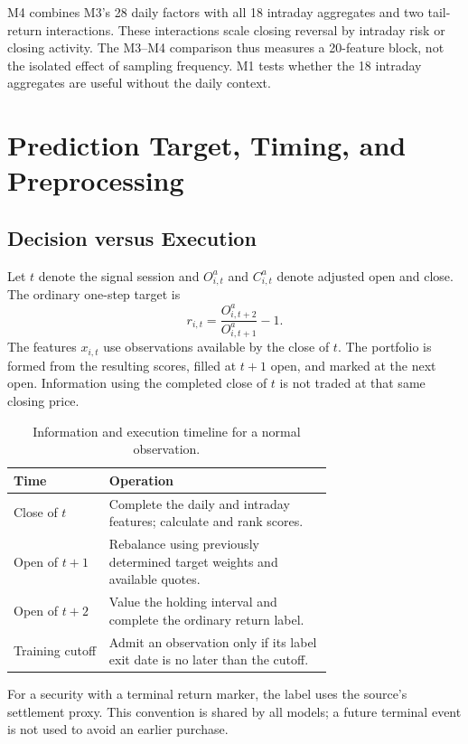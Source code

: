 \documentclass[11pt,a4paper]{article}
\begin{document}
M4 combines M3's 28 daily factors with all 18 intraday aggregates and two
tail-return interactions. These interactions scale closing reversal by
intraday risk or closing activity. The M3--M4 comparison thus measures a
20-feature block, not the isolated effect of sampling frequency. M1 tests
whether the 18 intraday aggregates are useful without the daily context.

\section{Prediction Target, Timing, and Preprocessing}
\label{sec:labels}
\subsection{Decision versus Execution}
Let $t$ denote the signal session and $O^{a}_{i,t}$ and $C^{a}_{i,t}$ denote
adjusted open and close. The ordinary one-step target is
\begin{equation}
r_{i,t}=\frac{O^{a}_{i,t+2}}{O^{a}_{i,t+1}}-1.
\label{eq:label}
\end{equation}
The features $x_{i,t}$ use observations available by the close of $t$. The
portfolio is formed from the resulting scores, filled at $t+1$ open, and marked
at the next open. Information using the completed close of $t$ is not traded
at that same closing price.

\begin{table}[htbp]\centering\small
\caption{Information and execution timeline for a normal observation.}
\label{tab:timeline}
\begin{tabular}{lp{0.70\linewidth}}\toprule
Time & Operation\\\midrule
Close of $t$ & Complete the daily and intraday features; calculate and rank scores.\\
Open of $t+1$ & Rebalance using previously determined target weights and available quotes.\\
Open of $t+2$ & Value the holding interval and complete the ordinary return label.\\
Training cutoff & Admit an observation only if its label exit date is no later than the cutoff.\\\bottomrule
\end{tabular}
\end{table}

For a security with a terminal return marker, the label uses the source's
settlement proxy. This convention is shared by all models; a future terminal
event is not used to avoid an earlier purchase.
\end{document}
